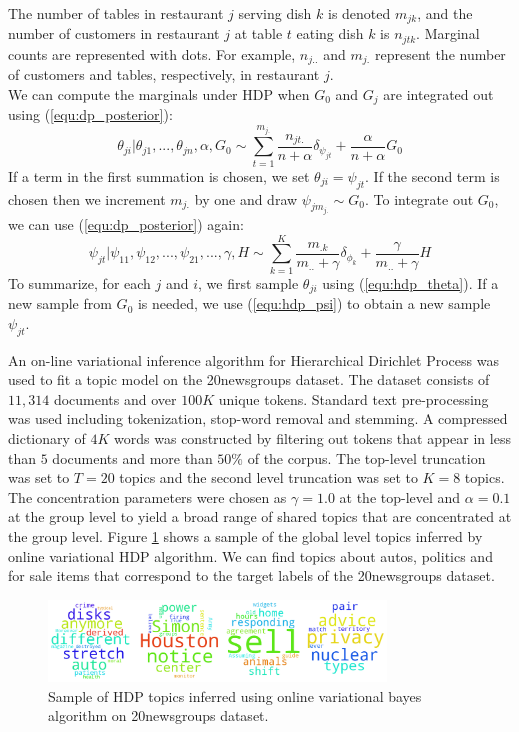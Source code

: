 The number of tables in restaurant $j$ serving dish $k$ is denoted $m_{jk}$, and the number of customers in restaurant $j$ at table $t$ eating dish $k$ is $n_{jtk}$. Marginal counts are represented with dots. For example, $n_{j..}$ and $m_{j.}$ represent the number of customers and tables, respectively, in restaurant $j$.\\

We can compute the marginals under HDP when $G_0$ and $G_j$ are integrated out using (\ref{equ:dp_posterior}):
\begin{equation}\label{equ:hdp_theta}
    \theta_{ji}|\theta_{j1},...,\theta_{jn},\alpha,G_0 \sim \sum_{t=1}^{m_{j.}} \frac{n_{jt.}}{n+\alpha}\delta_{\psi_{jt}} + \frac{\alpha}{n+\alpha}G_0
\end{equation}
If a term in the first summation is chosen, we set $\theta_{ji}=\psi_{jt}$. If the second term is chosen then we increment $m_{j.}$ by one and draw $\psi_{jm_{j.}}\sim G_0$. To integrate out $G_0$, we can use (\ref{equ:dp_posterior}) again:
\begin{equation}\label{equ:hdp_psi}
    \psi_{jt}|\psi_{11},\psi_{12},...,\psi_{21},...,\gamma,H \sim \sum_{k=1}^{K}\frac{m_{.k}}{m_{..}+\gamma}\delta_{\phi_k} + \frac{\gamma}{m_{..}+\gamma}H
\end{equation}
To summarize, for each $j$ and $i$, we first sample $\theta_{ji}$  using (\ref{equ:hdp_theta}). If a new sample from $G_0$ is needed, we use (\ref{equ:hdp_psi}) to obtain a new sample $\psi_{jt}$.

An on-line variational inference algorithm for Hierarchical Dirichlet Process \cite{wang11a} was used to fit a topic model on the 20newsgroups dataset. The dataset consists of $11,314$ documents and over $100K$ unique tokens. Standard text pre-processing was used including tokenization, stop-word removal and stemming. A compressed dictionary of $4K$ words was constructed by filtering out tokens that appear in less than $5$ documents and more than $50\%$ of the corpus. The top-level truncation was set to $T=20$ topics and the second level truncation was set to $K=8$ topics. The concentration parameters were chosen as $\gamma = 1.0$ at the top-level and $\alpha=0.1$ at the group level to yield a broad range of shared topics that are concentrated at the group level. Figure \ref{fig:hdp_topics} shows a sample of the global level topics inferred by online variational HDP algorithm. We can find topics about autos, politics and for sale items that correspond to the target labels of the 20newsgroups dataset.
\begin{figure}[thpb]
    \centering
    \includegraphics[width=0.8\textwidth, trim={10 10 10 10}]{figures/hdp_topics.png}
    \caption{Sample of HDP topics inferred using online variational bayes algorithm on 20newsgroups dataset.}
    \label{fig:hdp_topics}
\end{figure}

